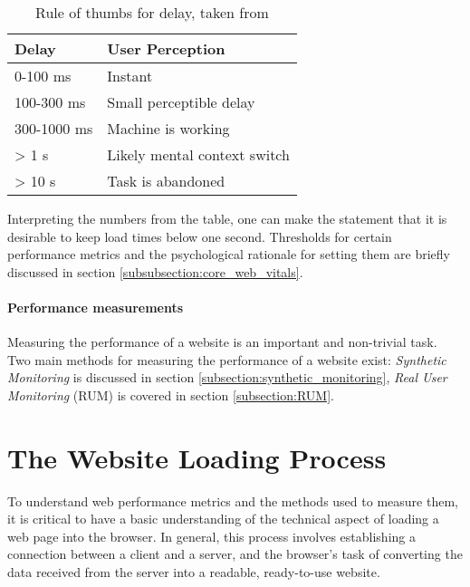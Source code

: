 \begin{table}[h]
	\small
	\centering
	\begin{tabular}{| l | l | }
	\hline
	Delay \cellcolor{lightgrey} & User Perception \cellcolor{lightgrey} \\
	\hline
	0-100 ms & Instant \\
	100-300 ms & Small perceptible delay \\
	300-1000 ms & Machine is working \\
	> 1 s & Likely mental context switch \\
	> 10 s & Task is abandoned \\
	\hline
	\end{tabular}
	\medskip
	\caption[Rule of thumbs for delay]{Rule of thumbs for delay, taken from \cite{2013Grigorik}}
	\label{table:perception}
\end{table}

Interpreting the numbers from the table, one can make the statement that it is desirable to keep load times below one second.
Thresholds for certain performance metrics and the psychological rationale for setting them are briefly discussed in section \ref{subsubsection:core_web_vitals}.




\paragraph{Performance measurements} %

Measuring the performance of a website is an important and non-trivial task.
Two main methods for measuring the performance of a website exist:
\textit{Synthetic Monitoring} is discussed in section \ref{subsection:synthetic_monitoring},
\textit{Real User Monitoring} (RUM) is covered in section \ref{subsection:RUM}.


\section{The Website Loading Process} %
\label{section:website_loading_process}


To understand web performance metrics and the methods used to measure them, it is critical to have a basic understanding of the technical aspect of loading a web page into the browser. 
In general, this process involves establishing a connection between a client and a server, and the browser's task of converting the data received from the server into a readable, ready-to-use website.

